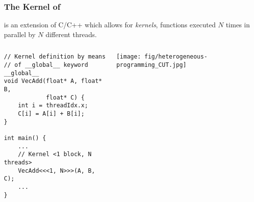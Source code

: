 \begin{frame}[fragile]
	\frametitle{The Kernel of \cuda}
	\cuda{} is an extension of C/C++ which allows for \emph{kernels}, functions executed $N$ times in parallel by $N$ different \cuda{} threads.
	\begin{columns}
		\begin{column}{.68\columnwidth}
\begin{lstlisting}
// Kernel definition by means 
// of __global__ keyword
__global__
void VecAdd(float* A, float* B,
            float* C) {
	int i = threadIdx.x;
	C[i] = A[i] + B[i];
}

int main() {
	...
	// Kernel <1 block, N threads> 
	VecAdd<<<1, N>>>(A, B, C);
	...
}
\end{lstlisting}
		\end{column}

		\begin{column}{.32\columnwidth}
			\texttt{[image: fig/heterogeneous-programming\_CUT.jpg]}
		\end{column}
	\end{columns}

\end{frame}
